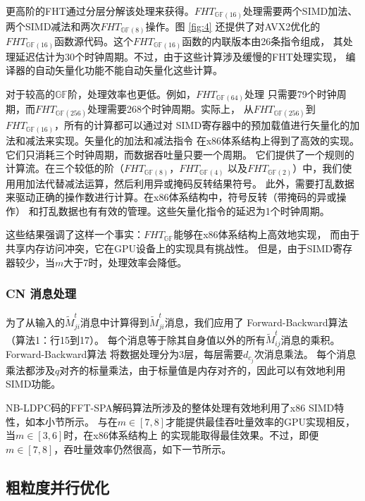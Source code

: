 \documentclass{cjc}
\begin{document}
  更高阶的FHT通过分层分解该处理来获得。$FHT_{\mathbb{GF}(16)}$处理需要两个SIMD加法、
  两个SIMD减法和两次$FHT_{\mathbb{GF}(8)}$操作。图 \ref{fig:4} 还提供了对AVX2优化的
  $FHT_{\mathbb{GF}(16)}$函数源代码。这个$FHT_{\mathbb{GF}(16)}$函数的内联版本由26条指令组成，
  其处理延迟估计为30个时钟周期。不过，由于这些计算涉及缓慢的FHT处理实现，
  编译器的自动矢量化功能不能自动矢量化这些计算。

  对于较高的$\mathbb{GF}$阶，处理效率也更低。例如，$FHT_{\mathbb{GF}(64)}$处理
  只需要79个时钟周期，而$FHT_{\mathbb{GF}(256)}$处理需要268个时钟周期。实际上，
  从$FHT_{\mathbb{GF}(256)}$到$FHT_{\mathbb{GF}(16)}$，所有的计算都可以通过对
  SIMD寄存器中的预加载值进行矢量化的加法和减法来实现。矢量化的加法和减法指令
  在x86体系结构上得到了高效的实现。它们只消耗三个时钟周期，而数据吞吐量只要一个周期。
  它们提供了一个规则的计算流。在三个较低的阶（$FHT_{\mathbb{GF}(8)}$，$FHT_{\mathbb{GF}(4)}$
  以及$FHT_{\mathbb{GF}(2)}$）中，我们使用用加法代替减法运算，然后利用异或掩码反转结果符号。
  此外，需要打乱数据来驱动正确的操作数进行计算。在x86体系结构中，符号反转（带掩码的异或操作）
  和打乱数据也有有效的管理。这些矢量化指令的延迟为1个时钟周期。

  这些结果强调了这样一个事实：$FHT_{\mathbb{GF}}$能够在x86体系结构上高效地实现，
  而由于共享内存访问冲突，它在GPU设备上的实现具有挑战性\cite{noauthor_andrade_nodate,andrade_optimized_2014}。
  但是，由于SIMD寄存器较少，当$m$大于7时，处理效率会降低。

\subsubsection{CN 消息处理}

  为了从输入的$\tilde{M}^t_{ji}$消息中计算得到$\tilde{M}^t_{ji}$消息，我们应用了
  Forward-Backward算法\cite{noauthor_wymeersch_nodate}（算法1：行15到17）。
  每个消息等于除其自身值以外的所有$\tilde{M}^t_{ij}$消息的乘积。Forward-Backward算法
  将数据处理分为3层，每层需要$d_{c_j}$次消息乘法\cite{boutillon_design_2013}。
  每个消息乘法都涉及$q$对齐的标量乘法，由于标量值是内存对齐的，因此可以有效地利用SIMD功能。

  NB-LDPC码的FFT-SPA解码算法所涉及的整体处理有效地利用了x86 SIMD特性，如本小节所示。
  与在$m\in[7,8]$才能提供最佳吞吐量效率的GPU实现相反，当$m\in[3,6]$时，在x86体系结构上
  的实现能取得最佳效果。不过，即便$m\in[7,8]$，吞吐量效率仍然很高，如下一节所示。

\subsection{粗粒度并行优化}
\end{document}
